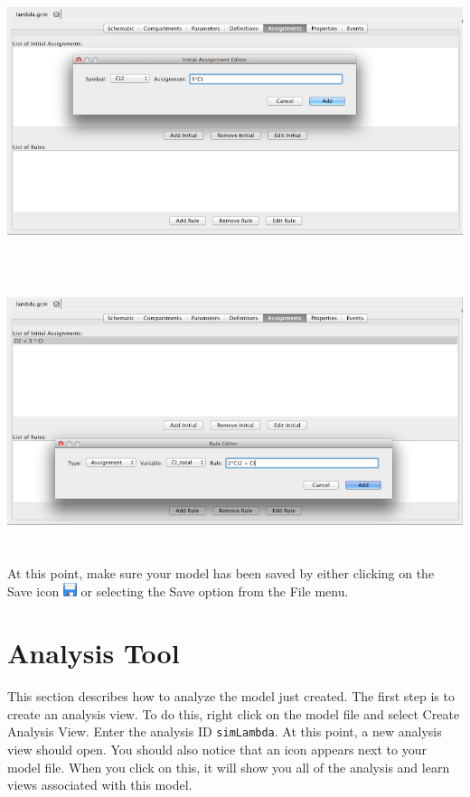 \documentclass[titlepage,11pt]{article}
\begin{document}
\begin{center}
\includegraphics[height=80mm]{screenshots/initial}
\end{center}

\begin{center}
\includegraphics[height=80mm]{screenshots/rule}
\end{center}


At this point, make sure your model has been saved by either clicking on the Save icon \includegraphics{../gui/icons/save} or selecting the Save option from the File menu.

\section{Analysis Tool}

This section describes how to analyze the model just created.  The first step is to create an analysis view.  To do this, right click on the model file and select Create Analysis View.  Enter the analysis ID {\tt simLambda}.  At this point, a new analysis view should open.  You should also notice that an icon appears next to your model file.  When you click on this, it will show you all of the analysis and learn views associated with this model.
\end{document}
